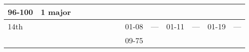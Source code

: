 \begin{longtable}{llllllllllllll}
{\begin{minipage}[t]{0.393in}
96-100\end{minipage}} & \multicolumn{1}{p{0.469in}|}{\begin{minipage}[t]{0.469in}\raggedright
1 major\end{minipage}} & \multicolumn{1}{p{0.923in}|}{\begin{minipage}[t]{0.923in}\raggedright
\end{minipage}} & \multicolumn{1}{p{0.469in}|}{\begin{minipage}[t]{0.469in}\raggedright
\end{minipage}} & \multicolumn{1}{p{0.626in}|}{\begin{minipage}[t]{0.626in}\raggedright
\end{minipage}} & \multicolumn{1}{p{0.469in}|}{\begin{minipage}[t]{0.469in}\centering
\end{minipage}}\\
\hline
\multicolumn{8}{p{1.150in}|}{\begin{minipage}[t]{1.150in}\centering
14th\end{minipage}} & \multicolumn{1}{|p{0.393in}|}{\begin{minipage}[t]{0.393in}\raggedright
01-08\end{minipage}} & \multicolumn{1}{p{0.469in}|}{\begin{minipage}[t]{0.469in}\raggedright
---\end{minipage}} & \multicolumn{1}{p{0.923in}|}{\begin{minipage}[t]{0.923in}\raggedright
01-11\end{minipage}} & \multicolumn{1}{p{0.469in}|}{\begin{minipage}[t]{0.469in}\raggedright
---\end{minipage}} & \multicolumn{1}{p{0.626in}|}{\begin{minipage}[t]{0.626in}\raggedright
01-19\end{minipage}} & \multicolumn{1}{p{0.469in}|}{\begin{minipage}[t]{0.469in}\centering
---\end{minipage}}\\
\hline
\multicolumn{8}{p{1.150in}|}{\begin{minipage}[t]{1.150in}\centering
\end{minipage}} & \multicolumn{1}{|p{0.393in}|}{\begin{minipage}[t]{0.393in}\raggedright
09-75\end{minipage}} & \multicolumn{1}{p{0.469in}|}{\begin{minipage}[t]{0.469in}\raggedright

\end{minipage}}
\end{longtable}
